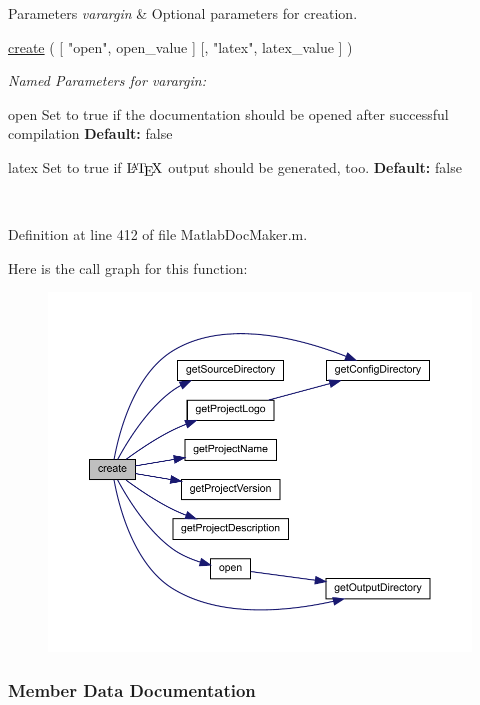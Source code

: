 \begin{DoxyParams}{Parameters}
{\em varargin} & Optional parameters for creation. 
\begin{DoxyCode}
\hyperlink{class_matlab_doc_maker_ad140908baecf279ebe64dc7c17f32b51}{create} (  [ \textcolor{stringliteral}{"open"}, open\_value ] [, \textcolor{stringliteral}{"latex"}, latex\_value ] ) 
\end{DoxyCode}
 {\itshape Named Parameters for varargin\+:}
\begin{DoxyItemize}
\item  open Set to true if the documentation should be opened after successful compilation {\bfseries Default\+:} false
\item  latex Set to true if $\text{\LaTeX}$ output should be generated, too. {\bfseries Default\+:} false
\end{DoxyItemize}\\
\hline
\end{DoxyParams}


Definition at line 412 of file Matlab\+Doc\+Maker.\+m.

Here is the call graph for this function\+:\nopagebreak
\begin{figure}[H]
\begin{center}
\leavevmode
\includegraphics[width=350pt]{class_matlab_doc_maker_ad140908baecf279ebe64dc7c17f32b51_cgraph}
\end{center}
\end{figure}


\subsubsection{Member Data Documentation}
\mbox{\label{class_matlab_doc_maker_a3a93527b0b6a2361ce74938b4f631b1f}} 
